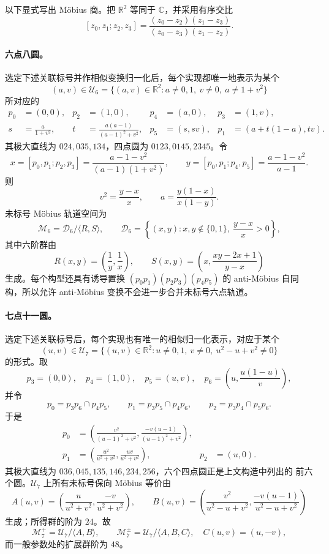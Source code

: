 \documentclass[11pt,a4paper]{ctexart}
\theoremstyle{definition}
\begin{document}
以下显式写出 Möbius 商。把 $\mathbb R^2$ 等同于 $\mathbb C$，并采用有序交比
\[
 [z_0,z_1;z_2,z_3]
 =\frac{(z_0-z_2)(z_1-z_3)}{(z_0-z_3)(z_1-z_2)}.
\]

\paragraph{六点八圆。}
选定下述关联标号并作相似变换归一化后，每个实现都唯一地表示为某个
\[
 (a,v)\in\mathcal U_6=
 \{(a,v)\in\mathbb R^2:a\ne0,1,\ v\ne0,\ a\ne1+v^2\}
\]
所对应的
\[
\begin{aligned}
p_0&=(0,0),&p_2&=(1,0),&p_4&=(a,0),&p_3&=(1,v),\\
s&=\frac{a}{1+v^2},&
t&=\frac{a(a-1)}{(a-1)^2+v^2},&
p_5&=(s,sv),&p_1&=(a+t(1-a),tv).
\end{aligned}
\]
其极大直线为 $024,035,134$，四点圆为 $0123,0145,2345$。令
\[
x=[p_0,p_1;p_2,p_3]
=\frac{a-1-v^2}{(a-1)(1+v^2)},\qquad
y=[p_0,p_1;p_4,p_5]
=\frac{a-1-v^2}{a-1}.
\]
则
\[
v^2=\frac{y-x}{x},\qquad a=\frac{y(1-x)}{x(1-y)}.
\]
未标号 Möbius 轨道空间为
\[
 \mathcal M_6=\mathcal D_6/\langle R,S\rangle,
 \qquad
 \mathcal D_6=\left\{(x,y):x,y\notin\{0,1\},\ \frac{y-x}{x}>0\right\},
\]
其中六阶群由
\[
 R(x,y)=\left(\frac1y,\frac1x\right),\qquad
 S(x,y)=\left(x,\frac{xy-2x+1}{y-x}\right)
\]
生成。每个构型还具有诱导置换
$(p_0p_1)(p_2p_3)(p_4p_5)$ 的 anti-Möbius 自同构，所以允许
anti-Möbius 变换不会进一步合并未标号六点轨道。

\paragraph{七点十一圆。}
选定下述关联标号后，每个实现也有唯一的相似归一化表示，对应于某个
\[
 (u,v)\in\mathcal U_7=
 \{(u,v)\in\mathbb R^2:u\ne0,1,\ v\ne0,\ u^2-u+v^2\ne0\}
\]
的形式。取
\[
 p_3=(0,0),\quad p_4=(1,0),\quad p_5=(u,v),\quad
 p_6=\left(u,\frac{u(1-u)}v\right),
\]
并令
\[
p_0=p_3p_6\cap p_4p_5,\qquad
p_1=p_3p_5\cap p_4p_6,\qquad
p_2=p_3p_4\cap p_5p_6.
\]
于是
\[
\begin{aligned}
p_0&=\left(\frac{v^2}{(u-1)^2+v^2},
           \frac{-v(u-1)}{(u-1)^2+v^2}\right),\\
p_1&=\left(\frac{u^2}{u^2+v^2},\frac{uv}{u^2+v^2}\right),
&p_2&=(u,0).
\end{aligned}
\]
其极大直线为 $036,045,135,146,234,256$，六个四点圆正是上文构造中列出的
前六个圆。$\mathcal U_7$ 上所有未标号保向 Möbius 等价由
\[
A(u,v)=\left(\frac{u}{u^2+v^2},\frac{-v}{u^2+v^2}\right),\qquad
B(u,v)=\left(\frac{v^2}{u^2-u+v^2},
             \frac{-v(u-1)}{u^2-u+v^2}\right)
\]
生成；所得群的阶为 $24$。故
\[
 \mathcal M_7^+=\mathcal U_7/\langle A,B\rangle,
 \qquad
 \mathcal M_7^{\pm}=\mathcal U_7/\langle A,B,C\rangle,
 \quad C(u,v)=(u,-v),
\]
而一般参数处的扩展群阶为 $48$。
\end{document}
